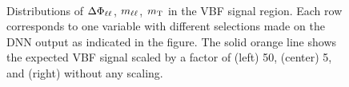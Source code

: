 \begin{figure}[h]
{        } \\
        {\caption[Distributions of $\dphill$, $\mll$, $\mT$ in the VBF \TwoJet signal region.]{Distributions of $\dphill$, $\mll$, $\mT$ in the VBF \TwoJet signal region.
                Each row corresponds to one variable with different selections made on the DNN output as indicated in the figure. The solid orange line shows the expected VBF signal scaled by a factor of (left) 50, (center) 5, and (right) without any scaling.
                \label{app:fig:dnn-inputs-hwwdecay} }}
    \end{figure}



